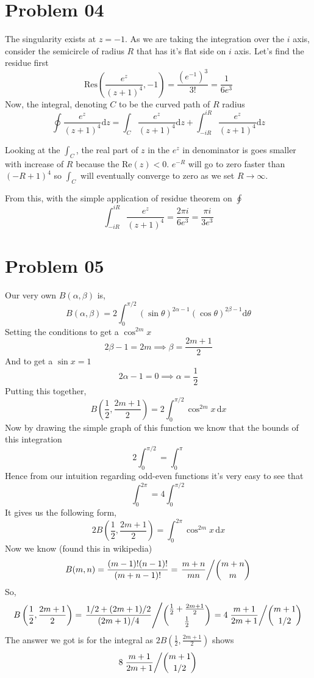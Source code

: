\documentclass[letter]{article}
\begin{document}
\section*{Problem 04} 
The singularity exists at $z = - 1$. As we are taking the integration over the $i$ axis, consider the semicircle of radius $R$ that has it's flat side on $i$ axis. Let's find the residue first
\[
\text{Res}\left(\frac{e^{z}}{(z+1)^{4}}, -1\right) = 
\frac{(e^{-1})^3}{3!} = \frac{1}{6 e^{3}}
\]
Now, the integral, denoting $C$ to be the curved path of $R$ radius
\[
\oint \frac{e^{z}}{(z+1)^{4}} \mathrm{d} z = 
\int_C \frac{e^{z}}{(z+1)^{4}}  \mathrm{d} z + 
\int_{-i R}^{ i R}  \frac{e^{z}}{(z+1)^{4}} 
\mathrm{d} z\] 

Looking at the $\int_C$, the real part of $z $ in the $e^{z}$ in denominator is goes smaller with increase of $R$ because the $\text{Re}(z) < 0$. $e^{-R}$ will go to zero faster than $(-R +1)^{4}$ so $\int_C$ will eventually converge to zero as we set $R\to \infty$. 

From this, with the simple application of residue theorem on $\oint$ 
\[
\boxed{
\int_{-i R}^{ i R}  \frac{e^{z}}{(z+1)^{4}} = \frac{2 \pi i}{6 e^{3}} = 
\frac{\pi i }{3 e^{3}}
}
\]

\section*{Problem 05} 
Our very own $B(\alpha,\beta)$ is, 
\[
B(\alpha, \beta) = 
2 \int_{0}^{ \pi / 2} \left(\sin \theta\right)^{2\alpha - 1} 
\left(\cos \theta\right)^{2 \beta - 1} 
\mathrm{d} \theta 
\] 
Setting the conditions to get a $\cos ^{2 m } x$
\[
2 \beta - 1 = 2 m \implies \beta = \frac{2m + 1}{2}
\]
And to get a $\sin x = 1$ 
\[
2\alpha - 1 = 0 \implies \alpha = \frac{1}{2}
\] 
Putting this together, 
\[
B\left(\frac{1}{2}, \frac{2m + 1}{2}\right) = 
2 \int_{0}^{ \pi / 2} \cos^{2m} x \, \mathrm{d} x 
\] 
Now by drawing the simple graph of this function we know that the bounds of this integration
\[
2 \int_{0}^{\pi / 2}  = \int_{0 }^{ \pi }   
\]
Hence from our intuition regarding odd-even functions it's very easy to see that
\[
	\int_{0}^{2 \pi} = 4 \int_{0}^{ \pi / 2}   
\]
It gives us the following form, 
\[
2 B\left(\frac{1}{2}, \frac{2m + 1}{2}\right) = 
\int_{0}^{2 \pi }  \cos^{2m } x \, \mathrm{d} x  
\]
Now we know (found this in wikipedia)
\[
	B(m,n) = \frac{(m-1)! (n-1)!}{(m+n-1)!} = \left. \frac{m + n}{mn } \middle/ \binom{m+n}{m}\right.
\]
So, 
\[
B\left(\frac{1}{2}, \frac{2m + 1}{2}\right) = \left.
\frac{ 1 / 2 + (2m + 1) / 2}{(2m + 1 )/ 4} 
\middle/	\binom{
	\frac{1}{2} + \frac{2m + 1}{2}}
{\frac{1}{2}}
\right. = 
 4 \left.
\frac{ m+1}{2m + 1} 
\middle/	\binom{m+1}
	{1 / 2}
\right.
\]The answer we got is for the integral  as $2 B(\frac{1}{2}, \frac{2m + 1}{2})$ shows
\[
 8 \left.
\frac{ m+1}{2m + 1} 
\middle/	\binom{m+1}
	{1 / 2}
\right.
\] 
\end{document}
